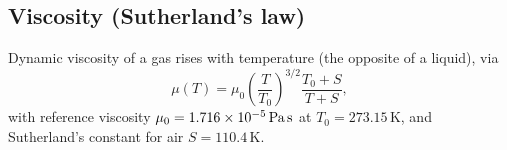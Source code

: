 \subsection{Viscosity (Sutherland's law)}
\label{app:sutherland}
Dynamic viscosity of a gas rises with temperature (the opposite of a liquid), via
\begin{equation}
    \mu(T) = \mu_0\left(\frac{T}{T_0}\right)^{3/2}\frac{T_0+S}{T+S},
\end{equation}
with reference viscosity $\mu_0=1.716\times10^{-5}\,\text{Pa\,s}$ at $T_0=273.15\,\text{K}$, and Sutherland's constant for air $S=110.4\,\text{K}$.
